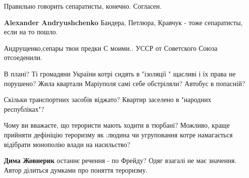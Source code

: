 \begin{itemize}
Правильно говорить сепаратисты, конечно. Согласен.

\begin{itemize}
 
\textbf{Alexander Andryushchenko} Бандера, Петлюра, Кравчук - тоже сепаратисты, если на то пошло.

 
Андрущенко,сепары твои предки С моими.. УССР от Советского Союза отсоеденили.
\end{itemize}

 

В плані? Ті громадяни України котрі сидять в "ізоляції " щасливі і їх права не
порушено? Жила квартали Маріуполя самі себе обстріляли? Автобус в попасній?

Скільки транспортних засобів віджато? Квартир заселено в "народних
республіках"?

Чому ви вважаєте, що терористи мають ходити в тюрбані? Можливо, краще прийняти
дефініцію тероризму як :людина чи угруповання котре намагається відібрати
монополію влади на насильство?

\begin{itemize}
 
\textbf{Дима Жовнерик} останнє речення - по Фрейду?
Одяг взагалі не має значення. Автор ділиться думками про поняття тероризму.

 

\end{itemize}
\end{itemize}
